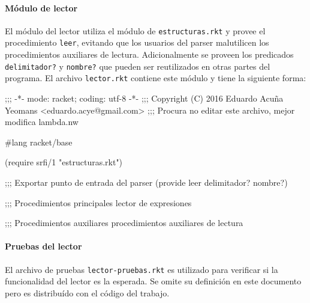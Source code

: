 \nwenddocs{}\paragraph{Módulo de lector} El módulo del lector utiliza el módulo de {\tt{}estructuras.rkt} y provee el procedimiento {\tt{}\protect{}leer}, evitando que los usuarios del parser malutilicen los procedimientos auxiliares de lectura. Adicionalmente se proveen los predicados {\tt{}\protect{}delimitador?} y {\tt{}\protect{}nombre?} que pueden ser reutilizados en otras partes del programa. El archivo {\tt{}lector.rkt} contiene este módulo y tiene la siguiente forma:

\nwenddocs{}\endmoddef
;;; -*- mode: racket; coding: utf-8 -*-
;;; Copyright (C) 2016 Eduardo Acuña Yeomans <eduardo.acye@gmail.com>
;;; Procura no editar este archivo, mejor modifica lambda.nw

#lang racket/base

(require srfi/1
         "estructuras.rkt")

;;; Exportar punto de entrada del parser
(provide leer
         delimitador? nombre?)

;;; Procedimientos principales
\LA{}lector de expresiones~{\nwtagstyle{}}\RA{}

;;; Procedimientos auxiliares
\LA{}procedimientos auxiliares de lectura~{\nwtagstyle{}}\RA{}
\nwendcode{}\nwdocspar

\nwenddocs{}\paragraph{Pruebas del lector} El archivo de pruebas {\tt{}lector-pruebas.rkt} es utilizado para verificar si la funcionalidad del lector es la esperada. Se omite su definición en este documento pero es distribuído con el código del trabajo.

